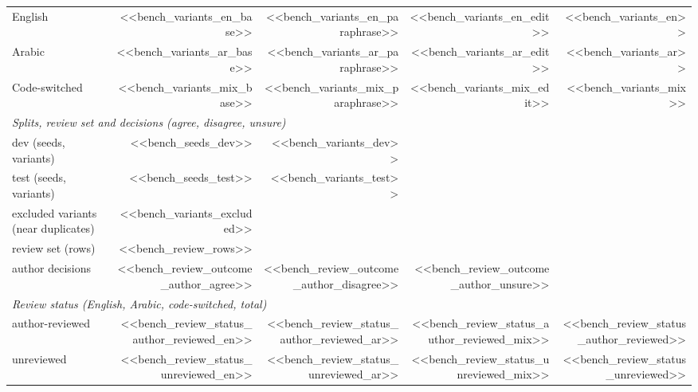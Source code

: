 \begin{tabular}{lrrrr}
English & <<bench_variants_en_base>> & <<bench_variants_en_paraphrase>> & <<bench_variants_en_edit>> & <<bench_variants_en>> \\
Arabic & <<bench_variants_ar_base>> & <<bench_variants_ar_paraphrase>> & <<bench_variants_ar_edit>> & <<bench_variants_ar>> \\
Code-switched & <<bench_variants_mix_base>> & <<bench_variants_mix_paraphrase>> & <<bench_variants_mix_edit>> & <<bench_variants_mix>> \\
\midrule
\multicolumn{5}{l}{\emph{Splits, review set and decisions (agree, disagree, unsure)}} \\
dev (seeds, variants) & <<bench_seeds_dev>> & <<bench_variants_dev>> & & \\
test (seeds, variants) & <<bench_seeds_test>> & <<bench_variants_test>> & & \\
excluded variants (near duplicates) & <<bench_variants_excluded>> & & & \\
review set (rows) & <<bench_review_rows>> & & & \\
author decisions & <<bench_review_outcome_author_agree>> & <<bench_review_outcome_author_disagree>> & <<bench_review_outcome_author_unsure>> & \\
\midrule
\multicolumn{5}{l}{\emph{Review status (English, Arabic, code-switched, total)}} \\
author-reviewed & <<bench_review_status_author_reviewed_en>> & <<bench_review_status_author_reviewed_ar>> & <<bench_review_status_author_reviewed_mix>> & <<bench_review_status_author_reviewed>> \\
unreviewed & <<bench_review_status_unreviewed_en>> & <<bench_review_status_unreviewed_ar>> & <<bench_review_status_unreviewed_mix>> & <<bench_review_status_unreviewed>> \\
\bottomrule
\end{tabular}
